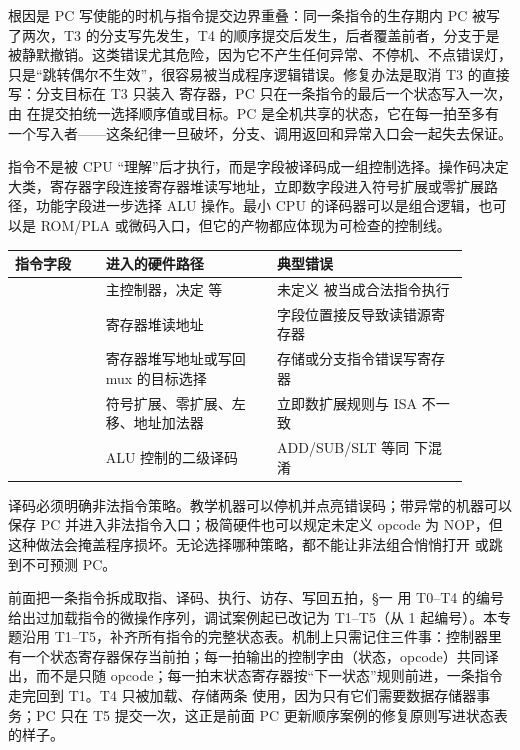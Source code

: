 根因是 PC 写使能的时机与指令提交边界重叠：同一条指令的生存期内 PC 被写了两次，T3 的分支写先发生，T4 的顺序提交后发生，后者覆盖前者，分支于是被静默撤销。这类错误尤其危险，因为它不产生任何异常、不停机、不点错误灯，只是“跳转偶尔不生效”，很容易被当成程序逻辑错误。修复办法是取消 T3 的直接写：分支目标在 T3 只装入  寄存器，PC 只在一条指令的最后一个状态写入一次，由  在提交拍统一选择顺序值或目标。PC 是全机共享的状态，它在每一拍至多有一个写入者——这条纪律一旦破坏，分支、调用返回和异常入口会一起失去保证。

指令不是被 CPU “理解”后才执行，而是字段被译码成一组控制选择。操作码决定大类，寄存器字段连接寄存器堆读写地址，立即数字段进入符号扩展或零扩展路径，功能字段进一步选择 ALU 操作。最小 CPU 的译码器可以是组合逻辑，也可以是 ROM/PLA 或微码入口，但它的产物都应体现为可检查的控制线。

\begin{longtable}{L{0.18\linewidth}L{0.34\linewidth}L{0.38\linewidth}}
\toprule
指令字段 & 进入的硬件路径 & 典型错误 \\
\midrule
{} & 主控制器，决定  等 & 未定义  被当成合法指令执行 \\
 & 寄存器堆读地址 & 字段位置接反导致读错源寄存器 \\
 & 寄存器堆写地址或写回 mux 的目标选择 & 存储或分支指令错误写寄存器 \\
 & 符号扩展、零扩展、左移、地址加法器 & 立即数扩展规则与 ISA 不一致 \\
 & ALU 控制的二级译码 & ADD/SUB/SLT 等同  下混淆 \\
\bottomrule
\end{longtable}

译码必须明确非法指令策略。教学机器可以停机并点亮错误码；带异常的机器可以保存 PC 并进入非法指令入口；极简硬件也可以规定未定义 opcode 为 NOP，但这种做法会掩盖程序损坏。无论选择哪种策略，都不能让非法组合悄悄打开  或跳到不可预测 PC。

前面把一条指令拆成取指、译码、执行、访存、写回五拍，§一 用 T0–T4 的编号给出过加载指令的微操作序列，调试案例起已改记为 T1–T5（从 1 起编号）。本专题沿用 T1–T5，补齐所有指令的完整状态表。机制上只需记住三件事：控制器里有一个状态寄存器保存当前拍；每一拍输出的控制字由（状态，opcode）共同译出，而不是只随 opcode；每一拍末状态寄存器按“下一状态”规则前进，一条指令走完回到 T1。T4 只被加载、存储两条  使用，因为只有它们需要数据存储器事务；PC 只在 T5 提交一次，这正是前面 PC 更新顺序案例的修复原则写进状态表的样子。

